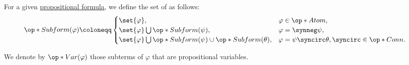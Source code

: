 \begin{definition}\label{def:propositional_subformula}
  For a given \hyperref[def:propositional_formula]{propositional formula}, we define the set of  as follows:
  \begin{equation*}
    \op*{Subform}(\varphi) \coloneqq \begin{cases}
      \set{ \varphi },                                                        &\varphi \in \op*{Atom}, \\
      \set{ \varphi } \bigcup \op*{Subform}(\psi),                            &\varphi = \synneg \psi, \\
      \set{ \varphi } \bigcup \op*{Subform}(\psi) \cup \op*{Subform}(\theta), &\varphi = \psi \syncirc \theta, {\syncirc} \in \op*{Conn}.
    \end{cases}
  \end{equation*}

  We denote by \( \op*{Var}(\varphi) \) those subterms of \( \varphi \) that are propositional variables.
\end{definition}

